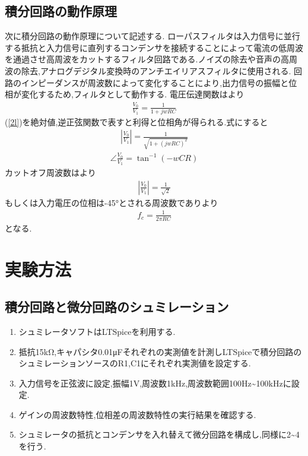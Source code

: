\documentclass[a4j,10pt,dvipdfmx]{jarticle}
\begin{document}
\subsection{積分回路の動作原理}
次に積分回路の動作原理について記述する.
ローパスフィルタは入力信号に並行する抵抗と入力信号に直列するコンデンサを接続することによって電流の低周波を通過させ高周波をカットするフィルタ回路である.ノイズの除去や音声の高周波の除去,アナログデジタル変換時のアンチエイリアスフィルタに使用される.
回路のインピーダンスが周波数によって変化することにより,出力信号の振幅と位相が変化するため,フィルタとして動作する.
電圧伝達関数は\cite{a}より
\begin{eqnarray}
  \label{2l}
  \frac{V_0}{V_1}=\frac{1}{1+jwRC}
\end{eqnarray}
(\ref{2l})を絶対値,逆正弦関数で表すと利得と位相角が得られる.式にすると
\begin{eqnarray}
  \label{2l1}
  |\frac{V_0}{V_1}|=\frac{1}{\sqrt{1+(jwRC)^2}}
\end{eqnarray}
\begin{eqnarray}
  \label{2l2}
  \angle\frac{V_0}{V_1}=\tan^{-1}(-wCR)
\end{eqnarray}
カットオフ周波数は\cite{a}より
\begin{eqnarray}
  \label{2la}
  |\frac{V_0}{V_1}|=\frac{1}{\sqrt{2}}
\end{eqnarray}
もしくは入力電圧の位相は-45°とされる周波数であり\cite{a}より
\begin{eqnarray}
  \label{2lb}
  f_c = \frac{1}{2\pi{RC}}
\end{eqnarray}
となる.
\section{実験方法}
\subsection{積分回路と微分回路のシュミレーション}
\begin{enumerate}
  \item シュミレータソフトはLTSpiceを利用する.
  \item 抵抗15kΩ,キャパシタ0.01μFそれぞれの実測値を計測しLTSpiceで積分回路のシュミレーションソースのR1,C1にそれぞれ実測値を設定する.
  \item 入力信号を正弦波に設定,振幅1V,周波数1kHz,周波数範囲100Hz\textasciitilde100kHzに設定.
  \item ゲインの周波数特性,位相差の周波数特性の実行結果を確認する.
  \item シュミレータの抵抗とコンデンサを入れ替えて微分回路を構成し,同様に2\textasciitilde4を行う.
\end{enumerate}
\end{document}
